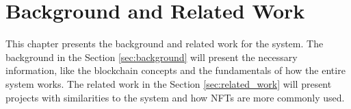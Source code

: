 \chapter{Background and Related Work}
\label{ch:background_and_related_work}

This chapter presents the background and related work for the system. The background in the Section \ref{sec:background} will present the necessary information, like the blockchain concepts and the fundamentals of how the entire system works. The related work in the Section \ref{sec:related_work} will present projects with similarities to the system and how NFTs are more commonly used.




